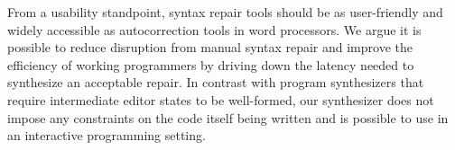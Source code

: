 \documentclass[sigplan,acmsmall,nonacm,screen]{acmart}\settopmatter{printfolios=false,printccs=false,printacmref=false}
\begin{document}



  From a usability standpoint, syntax repair tools should be as user-friendly and widely accessible as autocorrection tools in word processors. We argue it is possible to reduce disruption from manual syntax repair and improve the efficiency of working programmers by driving down the latency needed to synthesize an acceptable repair. In contrast with program synthesizers that require intermediate editor states to be well-formed, our synthesizer does not impose any constraints on the code itself being written and is possible to use in an interactive programming setting.
\end{document}
